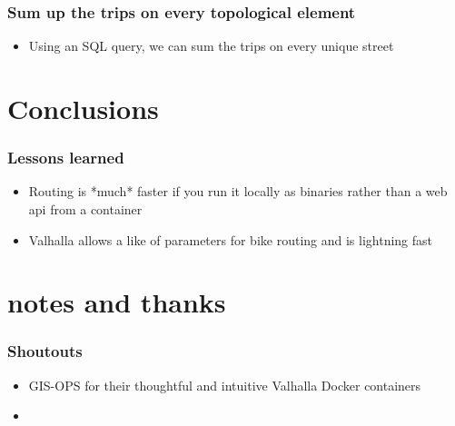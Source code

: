 \documentclass{beamer}
\begin{document}
\begin{frame}
    \frametitle{Sum up the trips on every topological element}


    \begin{itemize}
        \item Using an SQL query, we can sum the trips on every unique street
    \end{itemize}

\end{frame}

\section{Conclusions}
\begin{frame}
    \frametitle{Lessons learned}

    \begin{itemize}
        \item Routing is *much* faster if you run it locally as binaries rather than a web api from a container
        \item Valhalla allows a like of parameters for bike routing and is lightning fast
    \end{itemize}



\end{frame}
\section{notes and thanks}
\begin{frame}
    \frametitle{Shoutouts}

    \begin{itemize}
        \item GIS-OPS for their thoughtful and intuitive Valhalla Docker containers
        \item
    \end{itemize}



\end{frame}
\end{document}
